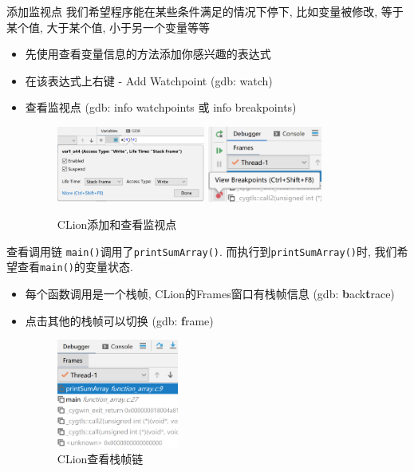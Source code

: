 \begin{frame}[fragile]{添加监视点}
    我们希望程序能在某些条件满足的情况下停下, 比如变量被修改, 等于某个值, 大于某个值, 小于另一个变量等等
    \begin{itemize}[<+- | alert@+>]
        \item 先使用查看变量信息的方法添加你感兴趣的表达式
        \item 在该表达式上右键 - Add Watchpoint (gdb: watch)
        \item 查看监视点 (gdb: info watchpoints 或 info breakpoints)
        \begin{figure}[ht!]
            \centering
            \includegraphics[height=25mm]{figs/clion_watchpoint.png}
            \includegraphics[height=25mm]{figs/clion_info_watchpoint.png}
            \caption{CLion添加和查看监视点}
        \end{figure}
    \end{itemize}
\end{frame}

\begin{frame}[fragile]{查看调用链}
    \texttt{main()}调用了\texttt{printSumArray()}.
    而执行到\texttt{printSumArray()}时, 我们希望查看\texttt{main()}的变量状态.
    \begin{itemize}[<+- | alert@+>]
        \item 每个函数调用是一个栈帧, CLion的Frames窗口有栈帧信息 (gdb: \textbf{b}ack\textbf{t}race)
        \item 点击其他的栈帧可以切换 (gdb: \textbf{f}rame)
        \begin{figure}[ht!]
            \centering
            \includegraphics[width=40mm]{figs/clion_frame.png}
            \caption{CLion查看栈帧链}
        \end{figure}
    \end{itemize}
\end{frame}

